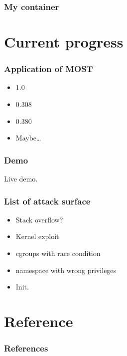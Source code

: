 \documentclass{beamer}
\begin{document}
\begin{frame}
    \frametitle{My container}
    
    
\end{frame}


\section{Current progress}
\begin{frame}
    \frametitle{Application of MOST}
    \begin{itemize}
        \item {}  1.0
        \item {}  0.308
        \item {}  0.380
        \item {}  Maybe\dots
    \end{itemize}
\end{frame}

\begin{frame}
    \frametitle{Demo}
    \centering Live demo.
\end{frame}

\begin{frame}
    \frametitle{List of attack surface}
    \begin{itemize}
        \item Stack overflow?
        \item Kernel exploit
        \item cgroups with race condition
        \item namespace with wrong privileges
        \item Init.
    \end{itemize}
\end{frame}

\section{Reference}
\begin{frame}[t, allowframebreaks]
    \frametitle{References}
    \printbibliography
\end{frame}
\end{document}
